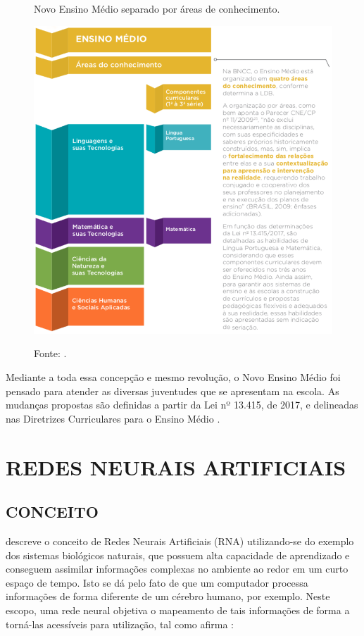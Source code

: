 \begin{figure}[H]
	\caption{Novo Ensino Médio separado por áreas de conhecimento.}
	\centering %
	\includegraphics[width=14cm]{resources/novo_ensino_medio.png} %
	\label{figura:novo_ensino_medio}
	\captionsetup{singlelinecheck = false, format= hang, justification=raggedright, labelsep=space, width=14cm}
	\caption*{\footnotesize Fonte: .}
\end{figure}

Mediante a toda essa concepção e mesmo revolução, o Novo Ensino Médio foi pensado para atender as diversas juventudes que se apresentam na escola. As mudanças propostas são definidas a partir da Lei nº 13.415, de 2017, e delineadas nas Diretrizes Curriculares para o Ensino Médio \cite{res32016}.

\section{REDES NEURAIS ARTIFICIAIS}

\subsection{CONCEITO}

 descreve o conceito de Redes Neurais Artificiais (RNA) utilizando-se do exemplo dos sistemas biológicos naturais, que possuem alta capacidade de aprendizado e conseguem assimilar informações complexas no ambiente ao redor em um curto espaço de tempo. Isto se dá pelo fato de que um computador processa informações de forma diferente de um cérebro humano, por exemplo. Neste escopo, uma rede neural objetiva o mapeamento de tais informações de forma a torná-las acessíveis para utilização, tal como afirma :

